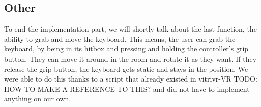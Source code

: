 \subsection{Other}
To end the implementation part, we will shortly talk about the last function, the ability to grab and move the keyboard. This means, the user can grab the keyboard, by being in its hitbox and pressing and holding the controller's grip button. They can move it around in the room and rotate it as they want. If they release the grip button, the keyboard gets static and stays in the position. We were able to do this thanks to a script that already existed in vitrivr-VR TODO: HOW TO MAKE A REFERENCE TO THIS? and did not have to implement anything on our own.
